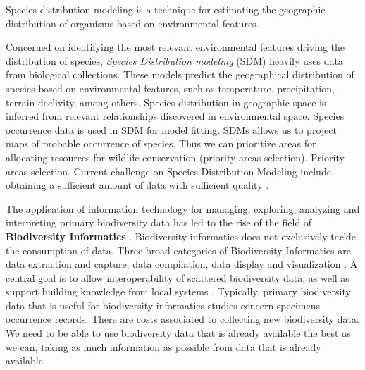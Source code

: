 Species distribution modeling is a technique for estimating the geographic distribution of organisms based on environmental features.

Concerned on identifying the most relevant environmental features driving the distribution of species, \textit{Species Distribution modeling} (SDM) heavily uses data from biological collections.
These models predict the geographical distribution of species based on environmental features, such as temperature, precipitation, terrain declivity, among others.
Species distribution in geographic space is inferred from relevant relationships discovered in environmental space.
Species occurrence data is used in SDM for model fitting. 
SDMs allows us to project maps of probable occurrence of species.
Thus we can prioritize areas for allocating resources for wildlife conservation (priority areas selection).
Priority areas selection. %
Current challenge on Species Distribution Modeling include obtaining a sufficient amount of data with sufficient quality \cite{Araujo2006}.






The application of information technology for managing, exploring, analyzing and interpreting primary biodiversity data has led to the rise of the field of \textbf{Biodiversity Informatics} \cite{Soberon2004}.
Biodiversity informatics does not exclusively tackle the consumption of data.
Three broad categories of Biodiversity Informatics are data extraction and capture, data compilation, data display and visualization \cite{Peterson2010}.
A central goal is to allow interoperability of scattered biodiversity data, as well as support building knowledge from local systems \cite{Bisby2000}.
Typically, primary biodiversity data that is useful for biodiversity informatics studies concern specimens occurrence records.
There are costs associated to collecting new biodiversity data.
We need to be able to use biodiversity data that is already available the best as we can, taking as much information as possible from data that is already available.











